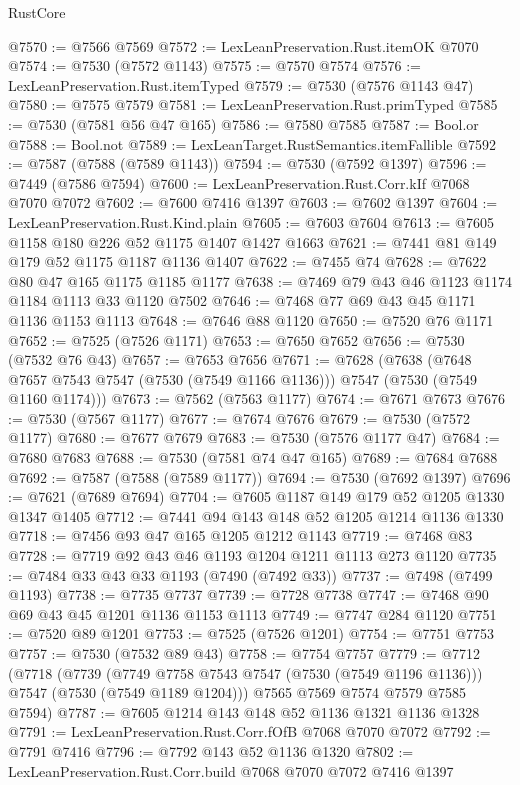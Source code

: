 \begin{lexlean}{RustCore}
\begin{coremodule}
@7570 := @7566 @7569
@7572 := LexLeanPreservation.Rust.itemOK @7070
@7574 := @7530 (@7572 @1143)
@7575 := @7570 @7574
@7576 := LexLeanPreservation.Rust.itemTyped
@7579 := @7530 (@7576 @1143 @47)
@7580 := @7575 @7579
@7581 := LexLeanPreservation.Rust.primTyped
@7585 := @7530 (@7581 @56 @47 @165)
@7586 := @7580 @7585
@7587 := Bool.or
@7588 := Bool.not
@7589 := LexLeanTarget.RustSemantics.itemFallible
@7592 := @7587 (@7588 (@7589 @1143))
@7594 := @7530 (@7592 @1397)
@7596 := @7449 (@7586 @7594)
@7600 := LexLeanPreservation.Rust.Corr.kIf @7068 @7070 @7072
@7602 := @7600 @7416 @1397
@7603 := @7602 @1397
@7604 := LexLeanPreservation.Rust.Kind.plain
@7605 := @7603 @7604
@7613 := @7605 @1158 @180 @226 @52 @1175 @1407 @1427 @1663
@7621 := @7441 @81 @149 @179 @52 @1175 @1187 @1136 @1407
@7622 := @7455 @74
@7628 := @7622 @80 @47 @165 @1175 @1185 @1177
@7638 := @7469 @79 @43 @46 @1123 @1174 @1184 @1113 @33 @1120 @7502
@7646 := @7468 @77 @69 @43 @45 @1171 @1136 @1153 @1113
@7648 := @7646 @88 @1120
@7650 := @7520 @76 @1171
@7652 := @7525 (@7526 @1171)
@7653 := @7650 @7652
@7656 := @7530 (@7532 @76 @43)
@7657 := @7653 @7656
@7671 := @7628
    (@7638 (@7648 @7657 @7543 @7547 (@7530 (@7549 @1166 @1136))) @7547 (@7530 (@7549 @1160 @1174)))
@7673 := @7562 (@7563 @1177)
@7674 := @7671 @7673
@7676 := @7530 (@7567 @1177)
@7677 := @7674 @7676
@7679 := @7530 (@7572 @1177)
@7680 := @7677 @7679
@7683 := @7530 (@7576 @1177 @47)
@7684 := @7680 @7683
@7688 := @7530 (@7581 @74 @47 @165)
@7689 := @7684 @7688
@7692 := @7587 (@7588 (@7589 @1177))
@7694 := @7530 (@7692 @1397)
@7696 := @7621 (@7689 @7694)
@7704 := @7605 @1187 @149 @179 @52 @1205 @1330 @1347 @1405
@7712 := @7441 @94 @143 @148 @52 @1205 @1214 @1136 @1330
@7718 := @7456 @93 @47 @165 @1205 @1212 @1143
@7719 := @7468 @83
@7728 := @7719 @92 @43 @46 @1193 @1204 @1211 @1113 @273 @1120
@7735 := @7484 @33 @43 @33 @1193 (@7490 (@7492 @33))
@7737 := @7498 (@7499 @1193)
@7738 := @7735 @7737
@7739 := @7728 @7738
@7747 := @7468 @90 @69 @43 @45 @1201 @1136 @1153 @1113
@7749 := @7747 @284 @1120
@7751 := @7520 @89 @1201
@7753 := @7525 (@7526 @1201)
@7754 := @7751 @7753
@7757 := @7530 (@7532 @89 @43)
@7758 := @7754 @7757
@7779 := @7712
    (@7718
      (@7739
        (@7749 @7758 @7543 @7547 (@7530 (@7549 @1196 @1136)))
        @7547
        (@7530 (@7549 @1189 @1204)))
      @7565
      @7569
      @7574
      @7579
      @7585
      @7594)
@7787 := @7605 @1214 @143 @148 @52 @1136 @1321 @1136 @1328
@7791 := LexLeanPreservation.Rust.Corr.fOfB @7068 @7070 @7072
@7792 := @7791 @7416
@7796 := @7792 @143 @52 @1136 @1320
@7802 := LexLeanPreservation.Rust.Corr.build @7068 @7070 @7072 @7416 @1397

\end{coremodule}
\end{lexlean}
